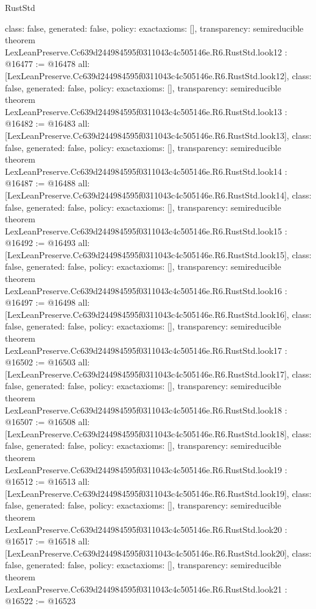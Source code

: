 \begin{lexlean}{RustStd}
\begin{coremodule}
{  class: false,
  generated: false,
  policy: exact{axioms: []},
  transparency: semireducible
}
theorem LexLeanPreserve.Cc639d244984595f0311043c4c505146e.R6.RustStd.look12 : @16477 := @16478 {
  all: [LexLeanPreserve.Cc639d244984595f0311043c4c505146e.R6.RustStd.look12],
  class: false,
  generated: false,
  policy: exact{axioms: []},
  transparency: semireducible
}
theorem LexLeanPreserve.Cc639d244984595f0311043c4c505146e.R6.RustStd.look13 : @16482 := @16483 {
  all: [LexLeanPreserve.Cc639d244984595f0311043c4c505146e.R6.RustStd.look13],
  class: false,
  generated: false,
  policy: exact{axioms: []},
  transparency: semireducible
}
theorem LexLeanPreserve.Cc639d244984595f0311043c4c505146e.R6.RustStd.look14 : @16487 := @16488 {
  all: [LexLeanPreserve.Cc639d244984595f0311043c4c505146e.R6.RustStd.look14],
  class: false,
  generated: false,
  policy: exact{axioms: []},
  transparency: semireducible
}
theorem LexLeanPreserve.Cc639d244984595f0311043c4c505146e.R6.RustStd.look15 : @16492 := @16493 {
  all: [LexLeanPreserve.Cc639d244984595f0311043c4c505146e.R6.RustStd.look15],
  class: false,
  generated: false,
  policy: exact{axioms: []},
  transparency: semireducible
}
theorem LexLeanPreserve.Cc639d244984595f0311043c4c505146e.R6.RustStd.look16 : @16497 := @16498 {
  all: [LexLeanPreserve.Cc639d244984595f0311043c4c505146e.R6.RustStd.look16],
  class: false,
  generated: false,
  policy: exact{axioms: []},
  transparency: semireducible
}
theorem LexLeanPreserve.Cc639d244984595f0311043c4c505146e.R6.RustStd.look17 : @16502 := @16503 {
  all: [LexLeanPreserve.Cc639d244984595f0311043c4c505146e.R6.RustStd.look17],
  class: false,
  generated: false,
  policy: exact{axioms: []},
  transparency: semireducible
}
theorem LexLeanPreserve.Cc639d244984595f0311043c4c505146e.R6.RustStd.look18 : @16507 := @16508 {
  all: [LexLeanPreserve.Cc639d244984595f0311043c4c505146e.R6.RustStd.look18],
  class: false,
  generated: false,
  policy: exact{axioms: []},
  transparency: semireducible
}
theorem LexLeanPreserve.Cc639d244984595f0311043c4c505146e.R6.RustStd.look19 : @16512 := @16513 {
  all: [LexLeanPreserve.Cc639d244984595f0311043c4c505146e.R6.RustStd.look19],
  class: false,
  generated: false,
  policy: exact{axioms: []},
  transparency: semireducible
}
theorem LexLeanPreserve.Cc639d244984595f0311043c4c505146e.R6.RustStd.look20 : @16517 := @16518 {
  all: [LexLeanPreserve.Cc639d244984595f0311043c4c505146e.R6.RustStd.look20],
  class: false,
  generated: false,
  policy: exact{axioms: []},
  transparency: semireducible
}
theorem LexLeanPreserve.Cc639d244984595f0311043c4c505146e.R6.RustStd.look21 : @16522 := @16523 {
}
\end{coremodule}
\end{lexlean}
